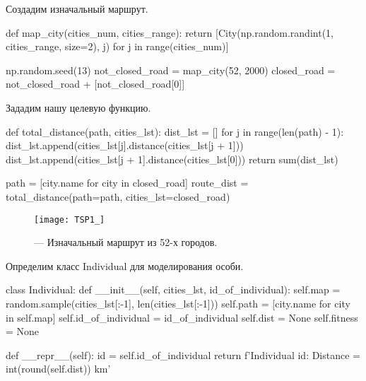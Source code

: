 Создадим изначальный маршрут.
\begin{pyin}
def map_city(cities_num, cities_range):
  return [City(np.random.randint(1, cities_range, size=2), j)
          for j in range(cities_num)]
\end{pyin}

\begin{pyin}
np.random.seed(13)
not_closed_road = map_city(52, 2000)
closed_road = not_closed_road + [not_closed_road[0]]
\end{pyin}

Зададим нашу целевую функцию.
\begin{pyin}
def total_distance(path, cities_lst):
  dist_lst = []
  for j in range(len(path) - 1):
     dist_lst.append(cities_lst[j].distance(cities_lst[j + 1]))
  dist_lst.append(cities_lst[j + 1].distance(cities_lst[0]))
  return sum(dist_lst)
\end{pyin}

\begin{pyin}
path = [city.name for city in closed_road]
route_dist = total_distance(path=path, cities_lst=closed_road)
\end{pyin}

\begin{figure}[h!!]
\centering
\texttt{[image: TSP1\_]}
\caption{ --- Изначальный маршрут из 52-х городов.}
\label{img:TSP1_}
\end{figure}

Определим класс Individual для моделирования особи.
\begin{pyin}
class Individual:
  def __init__(self, cities_lst, id_of_individual):
    self.map = random.sample(cities_lst[:-1],
                             len(cities_lst[:-1]))
    self.path = [city.name for city in self.map]
    self.id_of_individual = id_of_individual
    self.dist = None
    self.fitness = None
\end{pyin}

\begin{pyprint}
  def __repr__(self):
    id = self.id_of_individual
    return f'Individual {id}: Distance = {int(round(self.dist))} km'
\end{pyprint}

